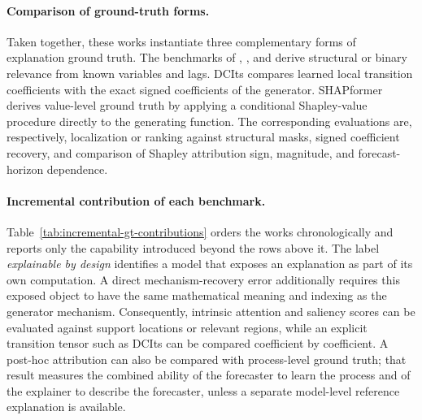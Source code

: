 \paragraph{Comparison of ground-truth forms.}
Taken together, these works instantiate three complementary forms of explanation
ground truth. The benchmarks of \citet{baric2021benchmarking},
\citet{almaghrabi2024multidimensional}, and
\citet{delibasoglu2025crossscale} derive structural or binary relevance from
known variables and lags. DCIts compares learned local transition coefficients
with the exact signed coefficients of the generator. SHAPformer derives
value-level ground truth by applying a conditional Shapley-value procedure
directly to the generating function. The corresponding evaluations are,
respectively, localization or ranking against structural masks, signed
coefficient recovery, and comparison of Shapley attribution
sign, magnitude, and forecast-horizon dependence.

\paragraph{Incremental contribution of each benchmark.}
Table~\ref{tab:incremental-gt-contributions} orders the works chronologically
and reports only the capability introduced beyond the rows above it. The label
\emph{explainable by design} identifies a model that exposes an explanation as
part of its own computation. A direct mechanism-recovery error additionally
requires this exposed object to have the same mathematical meaning and indexing
as the generator mechanism. Consequently, intrinsic attention and saliency
scores can be evaluated against support locations or relevant regions, while an
explicit transition tensor such as DCIts can be compared coefficient by
coefficient. A post-hoc attribution can also be compared with process-level
ground truth; that result measures the combined ability of the forecaster to
learn the process and of the explainer to describe the forecaster, unless a
separate model-level reference explanation is available.

